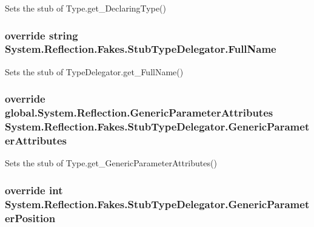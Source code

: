 Sets the stub of Type.\-get\-\_\-\-Declaring\-Type()

\hypertarget{class_system_1_1_reflection_1_1_fakes_1_1_stub_type_delegator_aaaefae5e8833a6a67119195506703159}{
\subsubsection[{Full\-Name}]{\setlength{\rightskip}{0pt plus 5cm}override string System.\-Reflection.\-Fakes.\-Stub\-Type\-Delegator.\-Full\-Name\hspace{0.3cm}{\ttfamily [get]}}}\label{class_system_1_1_reflection_1_1_fakes_1_1_stub_type_delegator_aaaefae5e8833a6a67119195506703159}


Sets the stub of Type\-Delegator.\-get\-\_\-\-Full\-Name()

\hypertarget{class_system_1_1_reflection_1_1_fakes_1_1_stub_type_delegator_ad729bcf41c557383886505596f8e42a2}{
\subsubsection[{Generic\-Parameter\-Attributes}]{\setlength{\rightskip}{0pt plus 5cm}override global.\-System.\-Reflection.\-Generic\-Parameter\-Attributes System.\-Reflection.\-Fakes.\-Stub\-Type\-Delegator.\-Generic\-Parameter\-Attributes\hspace{0.3cm}{\ttfamily [get]}}}\label{class_system_1_1_reflection_1_1_fakes_1_1_stub_type_delegator_ad729bcf41c557383886505596f8e42a2}


Sets the stub of Type.\-get\-\_\-\-Generic\-Parameter\-Attributes()

\hypertarget{class_system_1_1_reflection_1_1_fakes_1_1_stub_type_delegator_aa6dc06c74b9c68a8060758822b349e6d}{
\subsubsection[{Generic\-Parameter\-Position}]{\setlength{\rightskip}{0pt plus 5cm}override int System.\-Reflection.\-Fakes.\-Stub\-Type\-Delegator.\-Generic\-Parameter\-Position\hspace{0.3cm}{\ttfamily [get]}}}\label{class_system_1_1_reflection_1_1_fakes_1_1_stub_type_delegator_aa6dc06c74b9c68a8060758822b349e6d}


